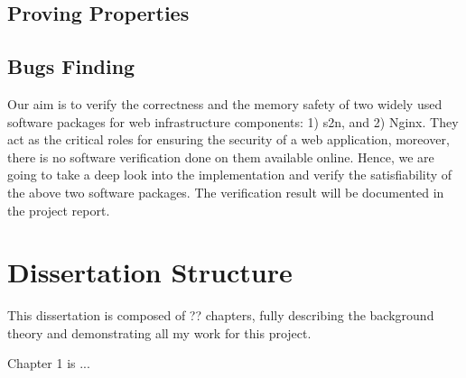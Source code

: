 \subsection{Proving Properties}

\subsection{Bugs Finding}

Our aim is to verify the correctness and the memory safety of two widely used software packages for web infrastructure components: 1) s2n, and 2) Nginx. They act as the critical roles for ensuring the security of a web application, moreover, there is no software verification done on them available online. Hence, we are going to take a deep look into the implementation and verify the satisfiability of the above two software packages. The verification result will be documented in the project report.



\section{Dissertation Structure}
This dissertation is composed of ?? chapters, fully describing the background theory and demonstrating all my work for this project.

Chapter 1 is ...